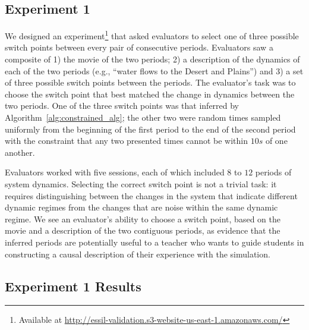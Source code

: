 \subsection{Experiment 1}\label{sec:experiment1-empirical-validation}

We designed an experiment\footnote{Available at \url{http://essil-validation.s3-website-us-east-1.amazonaws.com/}} that asked evaluators to select one of three possible switch points between every pair of consecutive periods. Evaluators saw a composite of 1) the movie of the two periods; 2) a description of the dynamics of each of the two periods (e.g., ``water flows to the Desert and Plains'') and 3) a set of three possible switch points between the periods. The evaluator's task was to choose the switch point that best matched the change in dynamics between the two periods. One of the three switch points was that inferred by Algorithm~\ref{alg:constrained_alg}; the other two were random times sampled uniformly from the beginning of the first period to the end of the second period with the constraint that any two presented times cannot be within $10s$ of one another.

Evaluators worked with five sessions, each of which included $8$ to $12$ periods of system dynamics. Selecting the correct switch point is not a trivial task: it requires distinguishing between the changes in the system that indicate different dynamic regimes from the changes that are noise within the same dynamic regime. We see an evaluator's ability to choose a switch point, based on the movie and a description of the two contiguous periods, as evidence that the inferred periods are potentially useful to a teacher who wants to guide students in constructing a causal description of their experience with the simulation.

\subsection{Experiment 1 Results}\label{sec:experiment1-empirical-validation-results}

